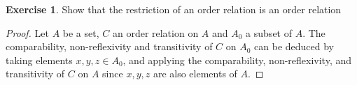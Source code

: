 \documentclass[11pt,a4paper,twoside]{article}
\theoremstyle{definition}
\newcounter{excounter}
\newtheorem{exercise}[excounter]{Exercise}
\begin{document}
\begin{exercise}

  Show that the restriction of an order relation is an order relation

\end{exercise}

\begin{proof}\hfill

  Let $A$ be a set, $C$ an order relation on $A$ and $A_0$ a subset of $A$.
  The comparability, non-reflexivity and transitivity of $C$ on $A_0$ can be deduced by taking elements $x, y, z \in A_0$,
  and applying the comparability, non-reflexivity, and transitivity of $C$ on $A$ since $x, y, z$ are also elements of $A$.

\end{proof}
\end{document}
